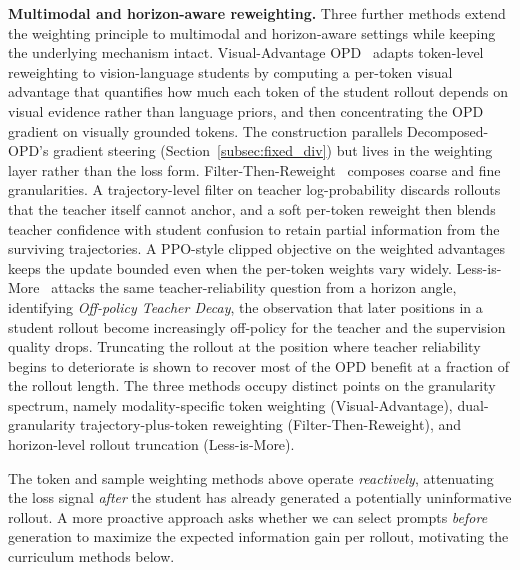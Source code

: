 \documentclass{article} %
\begin{document}
\textbf{Multimodal and horizon-aware reweighting.} Three further methods extend the weighting principle to multimodal and horizon-aware settings while keeping the underlying mechanism intact. Visual-Advantage OPD~\citep{2605.21924} adapts token-level reweighting to vision-language students by computing a per-token visual advantage that quantifies how much each token of the student rollout depends on visual evidence rather than language priors, and then concentrating the OPD gradient on visually grounded tokens. The construction parallels Decomposed-OPD's gradient steering (Section~\ref{subsec:fixed_div}) but lives in the weighting layer rather than the loss form. Filter-Then-Reweight~\citep{2606.02684} composes coarse and fine granularities. A trajectory-level filter on teacher log-probability discards rollouts that the teacher itself cannot anchor, and a soft per-token reweight then blends teacher confidence with student confusion to retain partial information from the surviving trajectories. A PPO-style clipped objective on the weighted advantages keeps the update bounded even when the per-token weights vary widely. Less-is-More~\citep{2605.27028} attacks the same teacher-reliability question from a horizon angle, identifying \emph{Off-policy Teacher Decay}, the observation that later positions in a student rollout become increasingly off-policy for the teacher and the supervision quality drops. Truncating the rollout at the position where teacher reliability begins to deteriorate is shown to recover most of the OPD benefit at a fraction of the rollout length. The three methods occupy distinct points on the granularity spectrum, namely modality-specific token weighting (Visual-Advantage), dual-granularity trajectory-plus-token reweighting (Filter-Then-Reweight), and horizon-level rollout truncation (Less-is-More).

The token and sample weighting methods above operate \emph{reactively}, attenuating the loss signal \emph{after} the student has already generated a potentially uninformative rollout. A more proactive approach asks whether we can select prompts \emph{before} generation to maximize the expected information gain per rollout, motivating the curriculum methods below.
\end{document}
